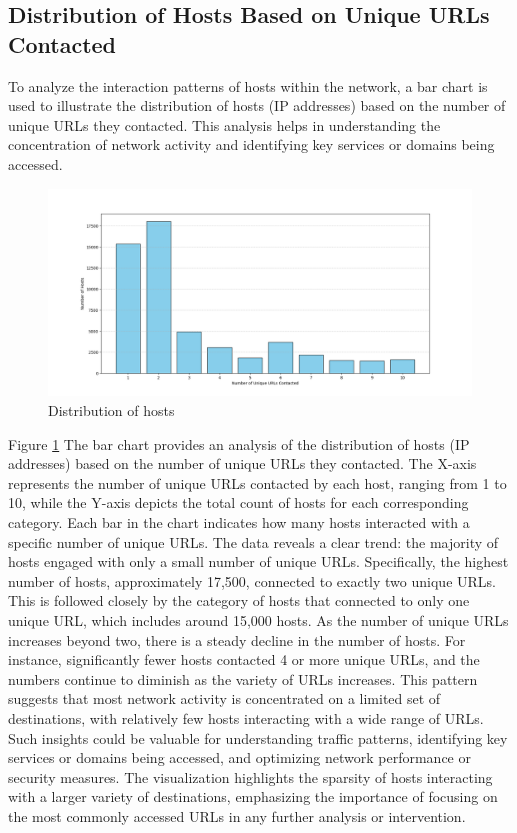 \subsection{Distribution of Hosts Based on Unique URLs Contacted}
To analyze the interaction patterns of hosts within the network, a bar chart is used to illustrate the distribution of hosts (IP addresses) based on the number of unique URLs they contacted. This analysis helps in understanding the concentration of network activity and identifying key services or domains being accessed.

\begin{figure}
    \centering
    \includegraphics[width=\textwidth]{../Thesis_Docs/media/unic_urls.png}
    \caption{Distribution of hosts }
    \label{fig:ip}
\end{figure}

Figure \ref{fig:ip} The bar chart provides an analysis of the distribution of hosts (IP addresses) based on the number of unique URLs they contacted. The X-axis represents the number of unique URLs contacted by each host, ranging from 1 to 10, while the Y-axis depicts the total count of hosts for each corresponding category. Each bar in the chart indicates how many hosts interacted with a specific number of unique URLs. The data reveals a clear trend: the majority of hosts engaged with only a small number of unique URLs. Specifically, the highest number of hosts, approximately 17,500, connected to exactly two unique URLs. This is followed closely by the category of hosts that connected to only one unique URL, which includes around 15,000 hosts. As the number of unique URLs increases beyond two, there is a steady decline in the number of hosts. For instance, significantly fewer hosts contacted 4 or more unique URLs, and the numbers continue to diminish as the variety of URLs increases. This pattern suggests that most network activity is concentrated on a limited set of destinations, with relatively few hosts interacting with a wide range of URLs. Such insights could be valuable for understanding traffic patterns, identifying key services or domains being accessed, and optimizing network performance or security measures. The visualization highlights the sparsity of hosts interacting with a larger variety of destinations, emphasizing the importance of focusing on the most commonly accessed URLs in any further analysis or intervention.

